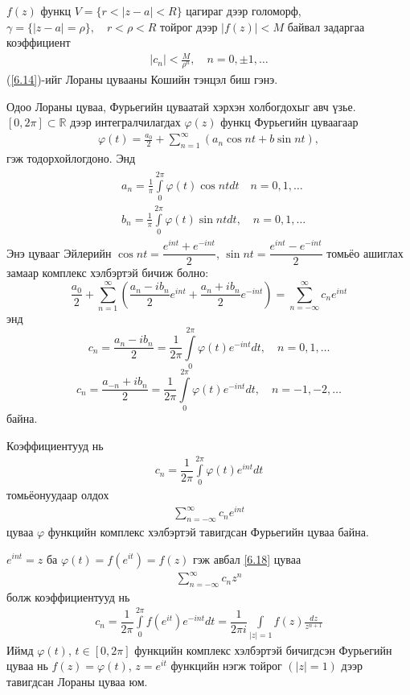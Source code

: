$f(z)$ функц $V=\{r<|z-a|<R\}$ цагираг дээр голоморф, $\gamma =\{|z-a|=\rho\}, \quad r<\rho <R$ тойрог дээр $|f(z)|<M$ байвал задаргаа коэффициент
\begin{eqnarray} \label{6.14}
    |c_n|<\frac{M}{\rho^n},\quad n=0, \pm 1,\ldots
\end{eqnarray}
(\ref{6.14})-ийг Лораны цувааны Кошийн тэнцэл биш  гэнэ.

Одоо Лораны цуваа, Фурьегийн цуваатай хэрхэн холбогдохыг  авч үзье. $[0,2\pi]\subset \mathbb{R}$ дээр интегралчилагдах $\varphi (z)$ функц Фурьегийн цуваагаар 
\begin{eqnarray}
    \varphi(t)=\frac{a_0}{2}+\sum\limits_{n=1}^\infty (a_n\cos nt +b\sin nt),
\end{eqnarray}
гэж тодорхойлогдоно. Энд
\begin{eqnarray}
\begin{split}
     &a_n=\frac{1}{\pi} \int\limits_0^{2\pi} \varphi(t)\cos nt dt \quad n=0,1,\ldots\\
    &b_n= \frac{1}{\pi} \int\limits_0^{2\pi} \varphi(t)\sin nt dt, \quad n=0,1,\ldots
\end{split}
\end{eqnarray}
Энэ цувааг Эйлерийн $\cos nt =\dfrac{e^{int}+e^{-int}}{2}$, $\sin nt =\dfrac{e^{int}-e^{-int}}{2}$ томьёо ашиглах замаар комплекс хэлбэртэй бичиж болно:
$$\frac{a_0}{2}+\sum\limits_{n=1}^\infty \left(\frac{a_n-ib_n}{2} e^{int}+\frac{a_n+ib_n}{2}e^{-int}\right) =\sum\limits_{n=-\infty}^\infty c_ne^{int}$$
энд $$c_n=\frac{a_n-ib_n}{2}=\dfrac{1}{2\pi }\int\limits_{0}^{2 \pi}\varphi (t)e^{-int}dt, \quad n=0,1,\ldots$$
$$c_n=\frac{a_{-n}+ib_n}{2}=\dfrac{1}{2\pi }\int\limits_{0}^{2 \pi}\varphi (t)e^{-int}dt, \quad n=-1,-2,\ldots$$
байна.

Коэффициентууд нь
\begin{eqnarray}
c_n=\dfrac{1}{2\pi }\int\limits_{0}^{2 \pi}\varphi (t)e^{int}dt
\end{eqnarray}
томьёонуудаар олдох
\begin{eqnarray} \label{6.18}
\sum\limits_{n=-\infty}^\infty c_ne^{int}
\end{eqnarray}
цуваа $\varphi$ функцийн комплекс хэлбэртэй тавигдсан Фурьегийн цуваа байна.

$e^{int}=z$ ба $\varphi (t)=f(e^{it})=f(z)$ гэж авбал \ref{6.18} цуваа 
\begin{eqnarray} 
\sum\limits_{n=-\infty}^\infty c_n z^n
\end{eqnarray}
болж коэффициентууд нь 
\begin{eqnarray}
c_n=\dfrac{1}{2\pi }\int\limits_{0}^{2 \pi} f (e^{it})e^{-int}dt= \dfrac{1}{2\pi i}\int\limits_{|z|=1} f(z)\frac{dz}{z^{n+1}}
\end{eqnarray}
Иймд $\varphi (t)$, $t\in [0, 2\pi]$ функцийн комплекс хэлбэртэй бичигдсэн Фурьегийн цуваа нь $f(z)=\varphi (t)$, $z=e^{it}$ функцийн нэгж тойрог $(|z|=1)$ дээр тавигдсан Лораны цуваа юм.

